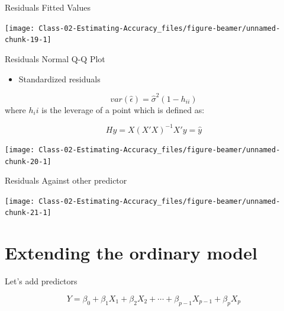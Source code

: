 \documentclass[
  ignorenonframetext,
]{beamer}
\providecommand{\tightlist}{%
  \setlength{\itemsep}{0pt}\setlength{\parskip}{0pt}}
\begin{document}
\begin{frame}{Residuals\textbar{} Fitted Values}
\protect\hypertarget{residuals-fitted-values}{}

\begin{center}\texttt{[image: Class-02-Estimating-Accuracy\_files/figure-beamer/unnamed-chunk-19-1]} \end{center}

\end{frame}

\begin{frame}{Residuals \textbar{} Normal Q-Q Plot}
\protect\hypertarget{residuals-normal-q-q-plot}{}

\begin{itemize}
\tightlist
\item
  Standardized residuals
\end{itemize}

\[
var(\hat\epsilon) = \hat\sigma^2(1-h_{ii})
\] where \(h_ii\) is the leverage of a point which is defined as:

\[
Hy = X(X'X)^{-1}X'y = \hat y
\]

\begin{center}\texttt{[image: Class-02-Estimating-Accuracy\_files/figure-beamer/unnamed-chunk-20-1]} \end{center}

\end{frame}

\begin{frame}{Residuals \textbar{} Against other predictor}
\protect\hypertarget{residuals-against-other-predictor}{}

\begin{center}\texttt{[image: Class-02-Estimating-Accuracy\_files/figure-beamer/unnamed-chunk-21-1]} \end{center}

\end{frame}

\hypertarget{extending-the-ordinary-model}{%
\section{Extending the ordinary
model}\label{extending-the-ordinary-model}}

\begin{frame}{Let's add predictors}
\protect\hypertarget{lets-add-predictors}{}

\[
Y = \beta_0 + \beta_1X_1 + \beta_2X_2 + \cdots + \beta_{p-1}X_{p-1} +\beta_pX_p 
\]

\end{frame}
\end{document}
